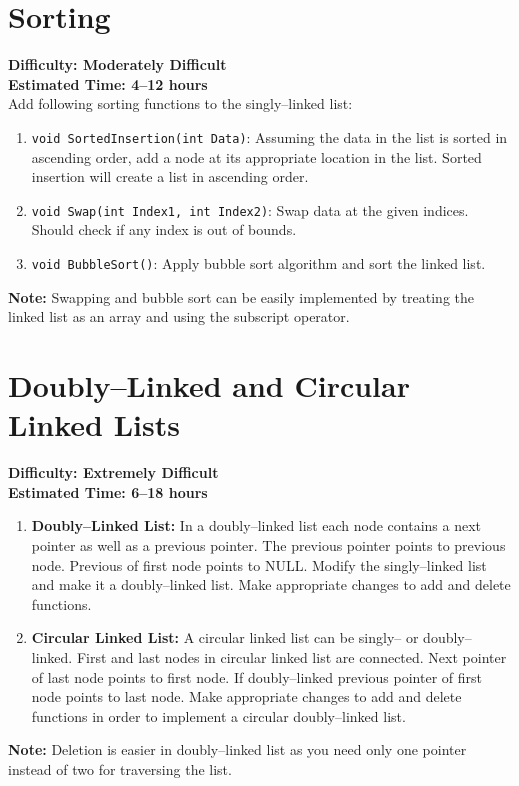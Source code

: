 \documentclass[12pt,a4paper]{article}
\begin{document}
\section{Sorting}
\noindent\textbf{Difficulty: Moderately Difficult}\\
\noindent\textbf{Estimated Time: 4--12 hours}\\[0.2cm]
Add following sorting functions to the singly--linked list:
\begin{enumerate}
\item \verb|void SortedInsertion(int Data)|: Assuming the data in the list is sorted in ascending order, add a node at its appropriate location in the list. Sorted insertion will create a list in ascending order.
\item \verb|void Swap(int Index1, int Index2)|: Swap data at the given indices. Should check if any index is out of bounds.
\item \verb|void BubbleSort()|: Apply bubble sort algorithm and sort the linked list.
\end{enumerate}
\noindent\textbf{Note:} Swapping and bubble sort can be easily implemented by treating the linked list as an array and using the subscript operator.
\section{Doubly--Linked and Circular Linked Lists}
\noindent\textbf{Difficulty: Extremely Difficult}\\
\noindent\textbf{Estimated Time: 6--18 hours}\\[-0.2cm]
\begin{enumerate}
\item \textbf{Doubly--Linked List:} In a doubly--linked list each node contains a next pointer as well as a previous pointer. The previous pointer points to previous node. Previous of first node points to NULL. Modify the singly--linked list and make it a doubly--linked list. Make appropriate changes to add and delete functions.
\item \textbf{Circular Linked List:} A circular linked list can be singly-- or doubly--linked. First and last nodes in circular linked list are connected. Next pointer of last node points to first node. If doubly--linked previous pointer of first node points to last node. Make appropriate changes to add and delete functions in order to implement a circular doubly--linked list.
\end{enumerate}
\noindent\textbf{Note:} Deletion is easier in doubly--linked list as you need only one pointer instead of two for traversing the list.
\newpage
\end{document}

